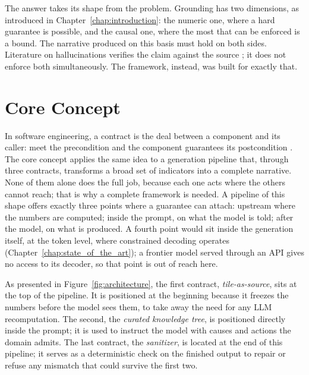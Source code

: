 \documentclass[12pt,a4paper,openright,twoside]{book}
\begin{document}
The answer takes its shape from the problem.
Grounding has two dimensions, as introduced in Chapter~\ref{chap:introduction}: the numeric one, where a hard guarantee is possible, and the causal one, where the most that can be enforced is a bound.
The narrative produced on this basis must hold on both sides.
Literature on hallucinations verifies the claim against the source \cite{min2023factscore}; it does not enforce both simultaneously.
The framework, instead, was built for exactly that.

\section{Core Concept}
\label{sec:coreconcept}

In software engineering, a contract is the deal between a component and its caller: meet the precondition and the component guarantees its postcondition \cite{meyer1992}.
The core concept applies the same idea to a generation pipeline that, through three contracts, transforms a broad set of indicators into a complete narrative.
None of them alone does the full job, because each one acts where the others cannot reach; that is why a complete framework is needed. 
A pipeline of this shape offers exactly three points where a guarantee can attach: upstream where the numbers are computed; inside the prompt, on what the model is told; after the model, on what is produced.
A fourth point would sit inside the generation itself, at the token level, where constrained decoding operates (Chapter~\ref{chap:state_of_the_art}); a frontier model served through an API gives no access to its decoder, so that point is out of reach here.

As presented in Figure~\ref{fig:architecture}, the first contract, \emph{tile-as-source}, sits at the top of the pipeline.
It is positioned at the beginning because it freezes the numbers before the model sees them, to take away the need for any \ac{LLM} recomputation.
The second, the \emph{curated knowledge tree}, is positioned directly inside the prompt; it is used to instruct the model with causes and actions the domain admits.
The last contract, the \emph{sanitizer}, is located at the end of this pipeline; it serves as a deterministic check on the finished output to repair or refuse any mismatch that could survive the first two.
\end{document}
